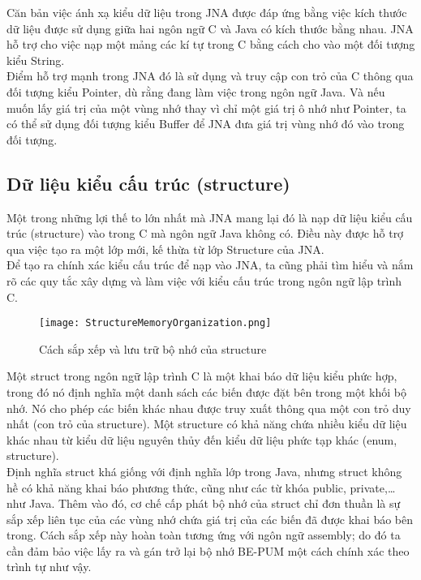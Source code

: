 Căn bản việc ánh xạ kiểu dữ liệu trong JNA được đáp ứng bằng việc kích thước dữ liệu được sử dụng giữa hai ngôn ngữ C và Java có kích thước bằng nhau. JNA hỗ trợ cho việc nạp một mảng các kí tự trong C bằng cách cho vào một đối tượng kiểu String.\\
 
Điểm hỗ trợ mạnh trong JNA đó là sử dụng và truy cập con trỏ của C thông qua đối tượng kiểu Pointer, dù rằng đang làm việc trong ngôn ngữ Java. Và nếu muốn lấy giá trị của một vùng nhớ thay vì chỉ một giá trị ô nhớ như Pointer, ta có thể sử dụng đối tượng kiểu Buffer để JNA đưa giá trị vùng nhớ đó vào trong đối tượng.


	\subsection{Dữ liệu kiểu cấu trúc (structure)}

Một trong những lợi thế to lớn nhất mà JNA mang lại đó là nạp dữ liệu kiểu cấu trúc (structure) vào trong C mà ngôn ngữ Java không có. Điều này được hỗ trợ qua việc tạo ra một lớp mới, kế thừa từ lớp Structure của JNA.\\

Để tạo ra chính xác kiểu cấu trúc để nạp vào JNA, ta cũng phải tìm hiểu và nắm rõ các quy tắc xây dựng và làm việc với kiểu cấu trúc trong ngôn ngữ lập trình C.

		\begin{center}
			\begin{figure}[h]
				\texttt{[image: StructureMemoryOrganization.png]}
				\caption{Cách sắp xếp và lưu trữ bộ nhớ của structure}				
			\end{figure}
		\end{center}

Một struct trong ngôn ngữ lập trình C là một khai báo dữ liệu kiểu phức hợp, trong đó nó định nghĩa một danh sách các biến được đặt bên trong một khối bộ nhớ. Nó cho phép các biến khác nhau được truy xuất thông qua một con trỏ duy nhất (con trỏ của structure). Một structure có khả năng chứa nhiều kiểu dữ liệu khác nhau từ kiểu dữ liệu nguyên thủy đến kiểu dữ liệu phức tạp khác (enum, structure).\\

Định nghĩa struct khá giống với định nghĩa lớp trong Java, nhưng struct không hề có khả năng khai báo phương thức, cũng như các từ khóa public, private,… như Java. Thêm vào đó, cơ chế cấp phát bộ nhớ của struct chỉ đơn thuần là sự sắp xếp liên tục của các vùng nhớ chứa giá trị của các biến đã được khai báo bên trong. Cách sắp xếp này hoàn toàn tương ứng với ngôn ngữ assembly; do đó ta cần đảm bảo việc lấy ra và gán trở lại bộ nhớ BE-PUM một cách chính xác theo trình tự như vậy.

